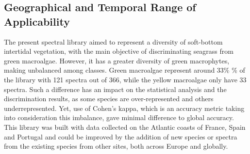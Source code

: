 \documentclass[
  letterpaper,
  11pt,
  english,
  singlespacing,
  headsepline]{MastersDoctoralThesis}
\begin{document}
\begin{spacing}{1.5}
\begin{table}

\caption{\label{tbl-pigmentTable}Photosynthetic and carotenoid pigments
present (1) or absent (0) in each taxonomic class, along with their
absorption wavelength measured in vivo and in vitro with an ASD
spectroradiometer and by High Performance Liquid Chromatography (HPLC)
respectively. Chl b: chlorophyll b, Chl c: chlorophyll c, Fuco:
fucoxanthin, Zea: zeaxanthin, Diato: diatoxanthin, Diadino:
diadinoxanthin, Neo: neoxanthin.}


\end{table}%

\subsection{Geographical and Temporal Range of
Applicability}\label{geographical-and-temporal-range-of-applicability}

The present spectral library aimed to represent a diversity of
soft-bottom intertidal vegetation, with the main objective of
discriminating seagrass from green macroalgae. However, it has a greater
diversity of green macrophytes, making unbalanced among classes. Green
macroalgae represent around 33\% \% of the library with 121 spectra out
of 366, while the yellow macroalgae only have 33 spectra. Such a
difference has an impact on the statistical analysis and the
discrimination results, as some species are over-represented and others
underrepresented. Yet, use of Cohen's kappa, which is an accuracy metric
taking into consideration this imbalance, gave minimal difference to
global accuracy. This library was built with data collected on the
Atlantic coasts of France, Spain and Portugal and could be improved by
the addition of new species or spectra from the existing species from
other sites, both across Europe and globally.


\end{spacing}
\end{document}
